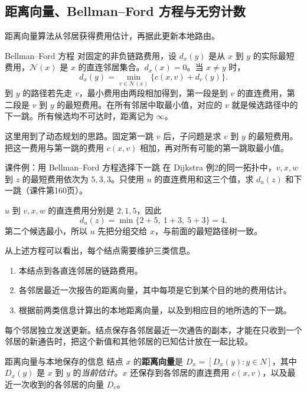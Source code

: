 \newpage
\subsection{距离向量、Bellman--Ford 方程与无穷计数}
距离向量算法从邻居获得费用估计，再据此更新本地路由。
\begin{proposition}{Bellman--Ford 方程}
对固定的非负链路费用，设 $d_x(y)$ 是从 $x$ 到 $y$ 的实际最短费用，$\mathcal{N}(x)$ 是 $x$ 的直连邻居集合。$d_x(x)=0$。当 $x\ne y$ 时，
\[
   d_x(y)=\min_{v\in\mathcal{N}(x)}\{c(x,v)+d_v(y)\}.
\]
到 $y$ 的路径若先走 $v$，最小费用由两段相加得到，第一段是到 $v$ 的直连费用，第二段是 $v$ 到 $y$ 的最短费用。在所有邻居中取最小值，对应的 $v$ 就是候选路径中的下一跳。所有候选均不可达时，距离记为 $\infty$。
\end{proposition}
\begin{remark}
  这里用到了动态规划的思路。固定第一跳 $v$ 后，子问题是求 $v$ 到 $y$ 的最短费用。把这一费用与第一跳的费用 $c(x,v)$ 相加，再对所有可能的第一跳取最小值。
\end{remark}

\begin{example}{课件例：用 Bellman--Ford 方程选择下一跳}
在 Dijkstra 例2的同一拓扑中，$v,x,w$ 到 $z$ 的最短费用依次为 $5,3,3$。只使用 $u$ 的直连费用和这三个值，求 $d_u(z)$ 和下一跳（课件第160页）。
\end{example}
\begin{solution}
$u$ 到 $v,x,w$ 的直连费用分别是 $2,1,5$，因此
\[
   d_u(z)=\min\{2+5,\ 1+3,\ 5+3\}=4.
\]
第二个候选最小，所以 $u$ 先把分组交给 $x$，与前面的最短路径树一致。
\end{solution}

从上述方程可以看出，每个结点需要维护三类信息。
\begin{enumerate}[nosep]
  \item 本结点到各直连邻居的链路费用。
  \item 各邻居最近一次报告的距离向量，其中每项是它到某个目的地的费用估计。
  \item 根据前两类信息计算出的本地距离向量，以及到相应目的地所选的下一跳。
\end{enumerate}
每个邻居独立发送更新。结点保存各邻居最近一次通告的副本，才能在只收到一个邻居的新通告时，把这个新值和其他邻居的已知估计放在一起比较。

\begin{definition}{距离向量与本地保存的信息}
结点 $x$ 的\textbf{距离向量}是 $D_x=[D_x(y):y\in N]$，其中 $D_x(y)$ 是 $x$ 到 $y$ 的\emph{当前估计}。$x$ 还保存到各邻居的直连费用 $c(x,v)$，以及最近一次收到的各邻居的向量 $D_v$。
\end{definition}

